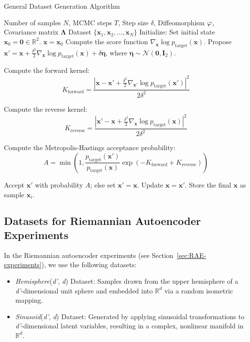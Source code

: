 \begin{algorithm}[h]
\caption{General Dataset Generation Algorithm}
\label{alg:Langevin-MCMC-with-M-H-correction}
\begin{algorithmic}[1]
\REQUIRE Number of samples $N$, MCMC steps $T$, Step size $\delta$, Diffeomorphism $\varphi$, Covariance matrix $\mathbf{\Lambda}$
\ENSURE Dataset $\{\mathbf{x}_1, \mathbf{x}_2, \dots, \mathbf{x}_N\}$
\STATE Initialize: Set initial state $\mathbf{x}_0 = \mathbf{0} \in \mathbb{R}^2$.
    \STATE $\mathbf{x} = \mathbf{x}_0$
        \STATE Compute the score function $\nabla_{\mathbf{x}} \log p_{\text{target}}(\mathbf{x})$.
        \STATE Propose $\mathbf{x}' = \mathbf{x} + \frac{\delta^2}{2} \nabla_{\mathbf{x}} \log p_{\text{target}}(\mathbf{x}) + \delta \boldsymbol{\eta}$, where $\boldsymbol{\eta} \sim \mathcal{N}(\mathbf{0}, \mathbf{I}_2)$.
        
        \STATE Compute the forward kernel:
        \[
        K_{\text{forward}} = \frac{|\mathbf{x} - \mathbf{x}' + \frac{\delta^2}{2} \nabla_{\mathbf{x}'} \log p_{\text{target}}(\mathbf{x}')|^2}{2\delta^2}
        \]

        \STATE Compute the reverse kernel:
        \[
        K_{\text{reverse}} = \frac{|\mathbf{x}' - \mathbf{x} + \frac{\delta^2}{2} \nabla_{\mathbf{x}} \log p_{\text{target}}(\mathbf{x})|^2}{2\delta^2}
        \]
        
        \STATE Compute the Metropolis-Hastings acceptance probability:
        \[
        A = \min\left(1, \frac{p_{\text{target}}(\mathbf{x}')}{p_{\text{target}}(\mathbf{x})} \exp\left( -K_{\text{forward}} + K_{\text{reverse}} \right) \right)
        \]
        
        \STATE Accept $\mathbf{x}'$ with probability $A$; else set $\mathbf{x}' = \mathbf{x}$.
        \STATE Update $\mathbf{x} = \mathbf{x}'$.
    \ENDFOR
    \STATE Store the final $\mathbf{x}$ as sample $\mathbf{x}_i$.
\ENDFOR
\end{algorithmic}
\end{algorithm}

\subsection{Datasets for Riemannian Autoencoder Experiments}
\label{app:rae_datasets}

In the Riemannian autoencoder experiments (see Section~\ref{sec:RAE-experiments}), we use the following datasets:
\begin{itemize}
    \item \textit{Hemisphere}(\textit{d'}, \textit{d}) Dataset: Samples drawn from the upper hemisphere of a \textit{d'}-dimensional unit sphere and embedded into $\mathbb{R}^d$ via a random isometric mapping.
    \item \textit{Sinusoid}(\textit{d'}, \textit{d}) Dataset: Generated by applying sinusoidal transformations to \textit{d'}-dimensional latent variables, resulting in a complex, nonlinear manifold in $\mathbb{R}^d$.
\end{itemize}

